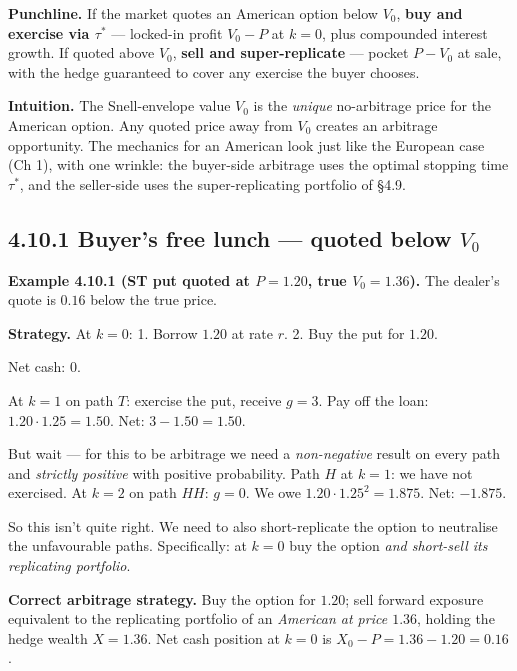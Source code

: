 \documentclass[
  10pt,
  twoside]{book}
\begin{document}
\textbf{Punchline.} If the market quotes an American option below
\(V_0\), \textbf{buy and exercise via \(\tau^*\)} --- locked-in profit
\(V_0 - P\) at \(k = 0\), plus compounded interest growth. If quoted
above \(V_0\), \textbf{sell and super-replicate} --- pocket \(P - V_0\)
at sale, with the hedge guaranteed to cover any exercise the buyer
chooses.

\textbf{Intuition.} The Snell-envelope value \(V_0\) is the
\emph{unique} no-arbitrage price for the American option. Any quoted
price away from \(V_0\) creates an arbitrage opportunity. The mechanics
for an American look just like the European case (Ch 1), with one
wrinkle: the buyer-side arbitrage uses the optimal stopping time
\(\tau^*\), and the seller-side uses the super-replicating portfolio of
§4.9.

\subsection{\texorpdfstring{4.10.1 Buyer's free lunch --- quoted below
\(V_0\)}{4.10.1 Buyer's free lunch --- quoted below V\_0}}\label{buyers-free-lunch-quoted-below-v_0}

\textbf{Example 4.10.1 (ST put quoted at \(P = 1.20\), true
\(V_0 = 1.36\)).} The dealer's quote is \(0.16\) below the true price.

\textbf{Strategy.} At \(k = 0\): 1. Borrow \(1.20\) at rate \(r\). 2.
Buy the put for \(1.20\).

Net cash: \(0\).

At \(k = 1\) on path \(T\): exercise the put, receive \(g = 3\). Pay off
the loan: \(1.20\cdot 1.25 = 1.50\). Net: \(3 - 1.50 = 1.50\).

But wait --- for this to be arbitrage we need a \emph{non-negative}
result on every path and \emph{strictly positive} with positive
probability. Path \(H\) at \(k = 1\): we have not exercised. At
\(k = 2\) on path \(HH\): \(g = 0\). We owe
\(1.20\cdot 1.25^2 = 1.875\). Net: \(-1.875\).

So this isn't quite right. We need to also short-replicate the option to
neutralise the unfavourable paths. Specifically: at \(k = 0\) buy the
option \emph{and short-sell its replicating portfolio}.

\textbf{Correct arbitrage strategy.} Buy the option for \(1.20\); sell
forward exposure equivalent to the replicating portfolio of an
\emph{American at price \(1.36\)}, holding the hedge wealth
\(X = 1.36\). Net cash position at \(k = 0\) is
\(X_0 - P = 1.36 - 1.20 = 0.16\).
\end{document}
